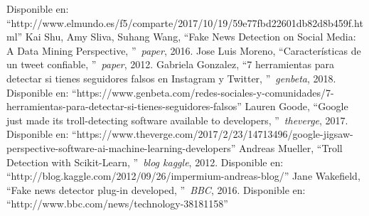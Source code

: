 \documentclass[../all.tex]{subfiles}
\begin{document}
\begin{thebibliography}{37}
		Disponible en: ``http://www.elmundo.es/f5/comparte/2017/10/19/59e77fbd22601db82d8b459f.html''
		Kai Shu, Amy Sliva, Suhang Wang, 
		\textquotedblleft Fake News Detection on Social Media: A Data Mining Perspective,
		\textquotedblright\ \textit{paper},
		2016.
		Jose Luis Moreno, 
		\textquotedblleft Características de un tweet confiable,
		\textquotedblright\ \textit{paper},
		2012.
		Gabriela Gonzalez, 
		\textquotedblleft 7 herramientas para detectar si tienes seguidores falsos en Instagram y Twitter,
		\textquotedblright\ \textit{genbeta},
		2018.
		Disponible en: ``https://www.genbeta.com/redes-sociales-y-comunidades/7-herramientas-para-detectar-si-tienes-seguidores-falsos''
		Lauren Goode, 
		\textquotedblleft Google just made its troll-detecting software available to developers,
		\textquotedblright\ \textit{theverge},
		2017.
		Disponible en: ``https://www.theverge.com/2017/2/23/14713496/google-jigsaw-perspective-software-ai-machine-learning-developers''
		Andreas Mueller, 
		\textquotedblleft Troll Detection with Scikit-Learn,
		\textquotedblright\ \textit{blog kaggle},
		2012.
		Disponible en: ``http://blog.kaggle.com/2012/09/26/impermium-andreas-blog/''
		Jane Wakefield, 
		\textquotedblleft Fake news detector plug-in developed,
		\textquotedblright\ \textit{BBC},
		2016.
		Disponible en: ``http://www.bbc.com/news/technology-38181158''


\end{thebibliography}
\end{document}
